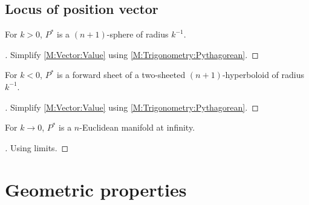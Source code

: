 \documentclass[stu, babel, american, biblatex, a4paper, leqno, draftall]{apa7}
\begin{document}
\subsection{Locus of position vector}
\begin{lemma}\label{SphericalLocus}
    For $k>0$, $P^\ast$ is a $\left(n+1\right)$-sphere of radius $k^{-1}$.
\end{lemma}
\begin{proof}[]
    Simplify \cref{M:Vector:Value} using \cref{M:Trigonometry:Pythagorean}.
\end{proof}
\begin{lemma}\label{HyperbolicLocus}
    For $k<0$, $P^\ast$ is a forward sheet of a two-sheeted $\left(n+1\right)$-hyperboloid of radius $k^{-1}$.
\end{lemma}
\begin{proof}[]
    Simplify \cref{M:Vector:Value} using \cref{M:Trigonometry:Pythagorean}.
\end{proof}
\begin{lemma}\label{EuclideanLocus}
    For $k\to0$, $P^\ast$ is a $n$-Euclidean manifold at infinity.
\end{lemma}
\begin{proof}[]
    Using limits.
\end{proof}
\section{Geometric properties}
\end{document}

